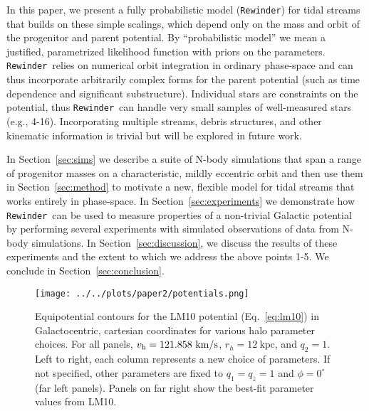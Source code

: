 \documentclass{emulateapj}
\newcommand{\vhalo}{v_{\rm h}}
\newcommand{\rewinder}{\texttt{Rewinder}}
\begin{document}
In this paper, we present a fully probabilistic model (\rewinder) for tidal streams that builds on these simple scalings, which depend only on the mass and orbit of the progenitor and parent potential. By ``probabilistic model'' we mean a justified, parametrized likelihood function with priors on the parameters. \rewinder\ relies on numerical orbit integration in ordinary phase-space and can thus incorporate arbitrarily complex forms for the parent potential (such as time dependence and significant substructure). Individual stars are constraints on the potential, thus \rewinder\ can handle very small samples of well-measured stars (e.g., 4-16). Incorporating multiple streams, debris structures, and other kinematic information is trivial but will be explored in future work.

In Section~\ref{sec:sims} we describe a suite of N-body simulations that span a range of progenitor masses on a characteristic, mildly eccentric orbit and then use them in Section~\ref{sec:method} to motivate a new, flexible model for tidal streams that works entirely in phase-space. In Section~\ref{sec:experiments} we demonstrate how \rewinder\ can be used to measure properties of a non-trivial Galactic potential by performing several experiments with simulated observations of data from N-body simulations. In Section~\ref{sec:discussion}, we discuss the results of these experiments and the extent to which we address the above points 1-5. We conclude in Section~\ref{sec:conclusion}.

\begin{figure*}[!ht]
\begin{center}
\texttt{[image: ../../plots/paper2/potentials.png]}
\caption{ Equipotential contours for the LM10 potential (Eq.~\ref{eq:lm10}) in Galactocentric, cartesian coordinates for various halo parameter choices. For all panels, $\vhalo=121.858~\mathrm{km}/\mathrm{s}$, $r_h=12~\mathrm{kpc}$, and $q_2=1$. Left to right, each column represents a new choice of parameters. If not specified, other parameters are fixed to $q_1=q_z=1$ and $\phi=0^\circ$ (far left panels). Panels on far right show the best-fit parameter values from LM10. }\label{fig:potential}
\end{center}
\end{figure*}
\end{document}
